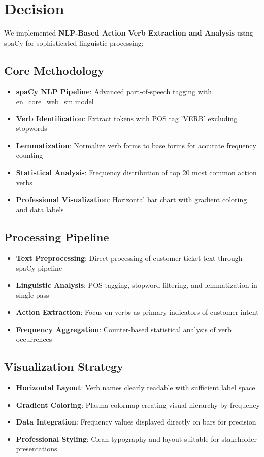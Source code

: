 \documentclass[11pt]{article}
\begin{document}
\section{Decision}

We implemented \textbf{NLP-Based Action Verb Extraction and Analysis} using spaCy for sophisticated linguistic processing:

\subsection{Core Methodology}
\begin{itemize}
\item \textbf{spaCy NLP Pipeline}: Advanced part-of-speech tagging with en\_core\_web\_sm model
\item \textbf{Verb Identification}: Extract tokens with POS tag 'VERB' excluding stopwords
\item \textbf{Lemmatization}: Normalize verb forms to base forms for accurate frequency counting
\item \textbf{Statistical Analysis}: Frequency distribution of top 20 most common action verbs
\item \textbf{Professional Visualization}: Horizontal bar chart with gradient coloring and data labels
\end{itemize}

\subsection{Processing Pipeline}
\begin{itemize}
\item \textbf{Text Preprocessing}: Direct processing of customer ticket text through spaCy pipeline
\item \textbf{Linguistic Analysis}: POS tagging, stopword filtering, and lemmatization in single pass
\item \textbf{Action Extraction}: Focus on verbs as primary indicators of customer intent
\item \textbf{Frequency Aggregation}: Counter-based statistical analysis of verb occurrences
\end{itemize}

\subsection{Visualization Strategy}
\begin{itemize}
\item \textbf{Horizontal Layout}: Verb names clearly readable with sufficient label space
\item \textbf{Gradient Coloring}: Plasma colormap creating visual hierarchy by frequency
\item \textbf{Data Integration}: Frequency values displayed directly on bars for precision
\item \textbf{Professional Styling}: Clean typography and layout suitable for stakeholder presentations
\end{itemize}
\end{document}
